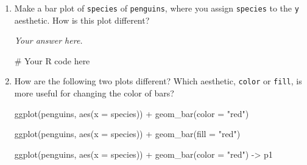 \documentclass[
  letterpaper,
  DIV=11,
  numbers=noendperiod]{scrreprt}
\newenvironment{Shaded}{\begin{snugshade}}{\end{snugshade}}
\newcommand{\AttributeTok}[1]{\textcolor[rgb]{0.40,0.45,0.13}{#1}}
\newcommand{\CommentTok}[1]{\textcolor[rgb]{0.37,0.37,0.37}{#1}}
\newcommand{\FunctionTok}[1]{\textcolor[rgb]{0.28,0.35,0.67}{#1}}
\newcommand{\NormalTok}[1]{\textcolor[rgb]{0.00,0.23,0.31}{#1}}
\newcommand{\OtherTok}[1]{\textcolor[rgb]{0.00,0.23,0.31}{#1}}
\newcommand{\SpecialCharTok}[1]{\textcolor[rgb]{0.37,0.37,0.37}{#1}}
\newcommand{\StringTok}[1]{\textcolor[rgb]{0.13,0.47,0.30}{#1}}
\begin{document}
\begin{enumerate}
\begin{tcolorbox}
  \end{tcolorbox}
\item
  Make a bar plot of \texttt{species} of \texttt{penguins}, where you
  assign \texttt{species} to the \texttt{y} aesthetic. How is this plot
  different?

  \begin{tcolorbox}[enhanced jigsaw, left=2mm, rightrule=.15mm, bottomtitle=1mm, opacitybacktitle=0.6, leftrule=.75mm, opacityback=0, colframe=quarto-callout-note-color-frame, bottomrule=.15mm, coltitle=black, toptitle=1mm, colback=white, titlerule=0mm, colbacktitle=quarto-callout-note-color!10!white, title={Answer}, toprule=.15mm, breakable, arc=.35mm]

  \emph{Your answer here.}

\begin{Shaded}
\begin{Highlighting}[]
\CommentTok{\# Your R code here}
\end{Highlighting}
\end{Shaded}

  \end{tcolorbox}
\item
  How are the following two plots different? Which aesthetic,
  \texttt{color} or \texttt{fill}, is more useful for changing the color
  of bars?

\begin{Shaded}
\begin{Highlighting}[]
\FunctionTok{ggplot}\NormalTok{(penguins, }\FunctionTok{aes}\NormalTok{(}\AttributeTok{x =}\NormalTok{ species)) }\SpecialCharTok{+}
  \FunctionTok{geom\_bar}\NormalTok{(}\AttributeTok{color =} \StringTok{"red"}\NormalTok{)}

\FunctionTok{ggplot}\NormalTok{(penguins, }\FunctionTok{aes}\NormalTok{(}\AttributeTok{x =}\NormalTok{ species)) }\SpecialCharTok{+}
  \FunctionTok{geom\_bar}\NormalTok{(}\AttributeTok{fill =} \StringTok{"red"}\NormalTok{)}
\end{Highlighting}
\end{Shaded}

  \begin{tcolorbox}[enhanced jigsaw, left=2mm, rightrule=.15mm, bottomtitle=1mm, opacitybacktitle=0.6, leftrule=.75mm, opacityback=0, colframe=quarto-callout-note-color-frame, bottomrule=.15mm, coltitle=black, toptitle=1mm, colback=white, titlerule=0mm, colbacktitle=quarto-callout-note-color!10!white, title={Answer}, toprule=.15mm, breakable, arc=.35mm]

\begin{Shaded}
\begin{Highlighting}[]
\FunctionTok{ggplot}\NormalTok{(penguins, }\FunctionTok{aes}\NormalTok{(}\AttributeTok{x =}\NormalTok{ species)) }\SpecialCharTok{+}
    \FunctionTok{geom\_bar}\NormalTok{(}\AttributeTok{color =} \StringTok{"red"}\NormalTok{) }\OtherTok{{-}\textgreater{}}\NormalTok{ p1}


\end{Highlighting}
\end{Shaded}
\end{tcolorbox}
\end{enumerate}
\end{document}
